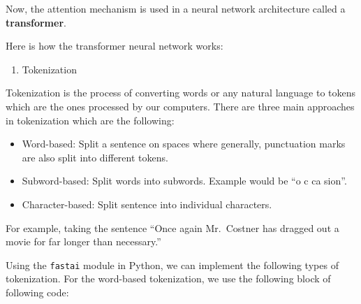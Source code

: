 \documentclass[
  letterpaper,
  DIV=11,
  numbers=noendperiod]{scrartcl}
\providecommand{\tightlist}{%
  \setlength{\itemsep}{0pt}\setlength{\parskip}{0pt}}\usepackage{longtable,booktabs,array}
\begin{document}
Now, the attention mechanism is used in a neural network architecture
called a \textbf{transformer}.

Here is how the transformer neural network works:

\begin{enumerate}
\def\labelenumi{\arabic{enumi}.}
\tightlist
\item
  Tokenization
\end{enumerate}

Tokenization is the process of converting words or any natural language
to tokens which are the ones processed by our computers. There are three
main approaches in tokenization which are the following:

\begin{itemize}
\tightlist
\item
  Word-based: Split a sentence on spaces where generally, punctuation
  marks are also split into different tokens.
\item
  Subword-based: Split words into subwords. Example would be ``o c ca
  sion''.
\item
  Character-based: Split sentence into individual characters.
\end{itemize}

For example, taking the sentence ``Once again Mr.~Costner has dragged
out a movie for far longer than necessary.''

Using the \texttt{fastai} module in Python, we can implement the
following types of tokenization. For the word-based tokenization, we use
the following block of following code:
\end{document}
